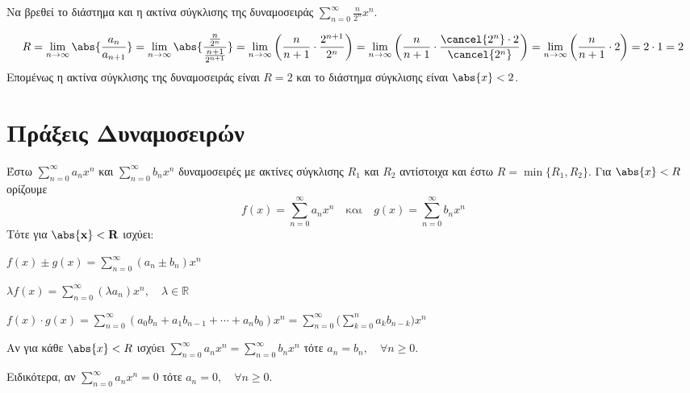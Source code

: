 \begin{example}
  Να βρεθεί το διάστημα και η ακτίνα σύγκλισης της δυναμοσειράς $ \sum_{n=0}^{\infty}
  \frac{n}{2^{n}} x^{n} $.
  \begin{solution}
    \[
      R= \lim_{n \to \infty} \abs{\frac{a_{n}}{a_{n+1}}} = 
      \lim_{n \to \infty} \abs{\frac{\frac{n}{2^{n}}}{\frac{n+1}{2^{n+1}}}} = 
      \lim_{n \to \infty} \left(\frac{n}{n+1} \cdot \frac{2^{n+1}}{2^{n}}\right) = 
      \lim_{n \to \infty} \left(\frac{n}{n+1} \cdot \frac{\cancel{2^{n}} \cdot
      2}{\cancel{2^{n}}} \right) = 
      \lim_{n \to \infty} \left(\frac{n}{n+1} \cdot 2 \right) = 2 \cdot 1 = 2
    \] 
    Επομένως η ακτίνα σύγκλισης της δυναμοσειράς είναι $ R=2 $ και το 
    διάστημα σύγκλισης είναι $ \abs{x} < 2 $.
  \end{solution}
\end{example}

\section*{Πράξεις Δυναμοσειρών}

Έστω $ \sum_{n=0}^{\infty} a_{n}x^{n} $ και $ \sum_{n=0}^{\infty} b_{n}x^{n} $ 
δυναμοσειρές με ακτίνες σύγκλισης $ R_{1} $ και $ R_{2} $ αντίστοιχα και έστω 
$ R = \min \{R_{1}, R_{2}\} $. Για $ \abs{x} < R $ ορίζουμε 
\[
  f(x) = \sum_{n=0}^{\infty} a_{n} x^{n} \quad \text{και} \quad g(x) =
  \sum_{n=0}^{\infty} b_{n} x^{n}
\] 
Τότε για $ \mathbf{\abs{x} < R} $ ισχύει:
\begin{myitemize}
  \item $ f(x)\pm g(x)= \sum_{n=0}^{\infty} (a_{n}\pm b_{n}) x^{n} $
  \item $ \lambda f(x) = \sum_{n=0}^{\infty} (\lambda a_{n}) x^{n}, \quad \lambda \in
    \mathbb{R} $
  \item $ f(x) \cdot g(x) = \sum_{n=0}^{\infty} (a_{0}b_{n} + a_{1}b_{n-1} + \cdots +
    a_{n} b_{0}) x^{n} = \sum_{n=0}^{\infty} \bigl(\sum_{k=0}^{n} a_{k} b_{n-k}\bigr) 
    x^{n} $
\end{myitemize}

\begin{prop}
  Αν για κάθε $ \abs{x} < R $ ισχύει $ \sum_{n=0}^{\infty} a_{n}x^{n} =
  \sum_{n=0}^{\infty} b_{n} x^{n} $ τότε $ a_{n}=b_{n}, \quad \forall n \geq 0 $.
\end{prop}

\begin{prop}
  Ειδικότερα, αν $ \sum_{n=0}^{\infty} a_{n}x^{n} = 0 $ τότε $ a_{n}=0, \quad \forall n
  \geq 0 $.
\end{prop}

